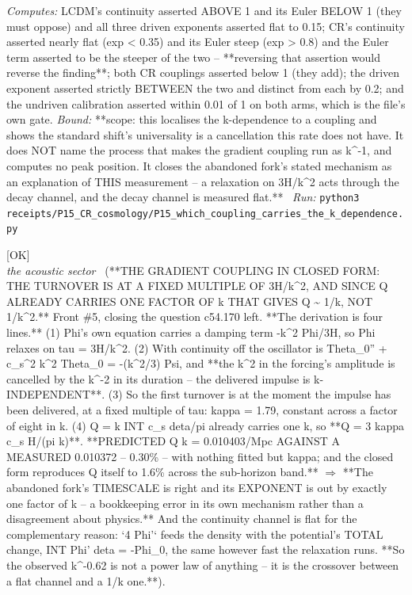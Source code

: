 \begin{description}
\emph{Computes:} LCDM's continuity asserted ABOVE 1 and its Euler BELOW 1 (they must oppose) and all three driven exponents asserted flat to 0.15; CR's continuity asserted nearly flat (\textbar{}exp\textbar{} < 0.35) and its Euler steep (\textbar{}exp\textbar{} > 0.8) and the Euler term asserted to be the steeper of the two -- **reversing that assertion would reverse the finding**; both CR couplings asserted below 1 (they add); the driven exponent asserted strictly BETWEEN the two and distinct from each by 0.2; and the undriven calibration asserted within 0.01 of 1 on both arms, which is the file's own gate.
 \emph{Bound:} **scope: this localises the k-dependence to a coupling and shows the standard shift's universality is a cancellation this rate does not have. It does NOT name the process that makes the gradient coupling run as k\textasciicircum{}-1, and computes no peak position. It closes the abandoned fork's stated mechanism as an explanation of THIS measurement -- a relaxation on 3H/k\textasciicircum{}2 acts through the decay channel, and the decay channel is measured flat.**
\ \emph{Run:} \texttt{python3 receipts/P15\_CR\_cosmology/P15\_which\_coupling\_carries\_the\_k\_dependence.py}
\item[\label{rcpt:P15_the_gradient_coupling_in_closed_form}\texttt{P15\_the\_gradient\_coupling\_in\_closed\_form}]\hfill\textsf{[OK]}\\
\textit{the acoustic sector} \ (**THE GRADIENT COUPLING IN CLOSED FORM: THE TURNOVER IS AT A FIXED MULTIPLE OF 3H/k\textasciicircum{}2, AND SINCE Q ALREADY CARRIES ONE FACTOR OF k THAT GIVES Q \textasciitilde{} 1/k, NOT 1/k\textasciicircum{}2.** Front \#5, closing the question c54.170 left. **The derivation is four lines.** (1) Phi's own equation carries a damping term -k\textasciicircum{}2 Phi/3H, so Phi relaxes on tau = 3H/k\textasciicircum{}2. (2) With continuity off the oscillator is Theta\_0'' + c\_s\textasciicircum{}2 k\textasciicircum{}2 Theta\_0 = -(k\textasciicircum{}2/3) Psi, and **the k\textasciicircum{}2 in the forcing's amplitude is cancelled by the k\textasciicircum{}-2 in its duration -- the delivered impulse is k-INDEPENDENT**. (3) So the first turnover is at the moment the impulse has been delivered, at a fixed multiple of tau: kappa = 1.79, constant across a factor of eight in k. (4) Q = k INT c\_s deta/pi already carries one k, so **Q = 3 kappa c\_s H/(pi k)**. **PREDICTED Q k = 0.010403/Mpc AGAINST A MEASURED 0.010372 -- 0.30\% -- with nothing fitted but kappa; and the closed form reproduces Q itself to 1.6\% across the sub-horizon band.** \ensuremath{\Rightarrow} **The abandoned fork's TIMESCALE is right and its EXPONENT is out by exactly one factor of k -- a bookkeeping error in its own mechanism rather than a disagreement about physics.** And the continuity channel is flat for the complementary reason: `4 Phi'` feeds the density with the potential's TOTAL change, INT Phi' deta = -Phi\_0, the same however fast the relaxation runs. **So the observed k\textasciicircum{}-0.62 is not a power law of anything -- it is the crossover between a flat channel and a 1/k one.**). 

\end{description}
